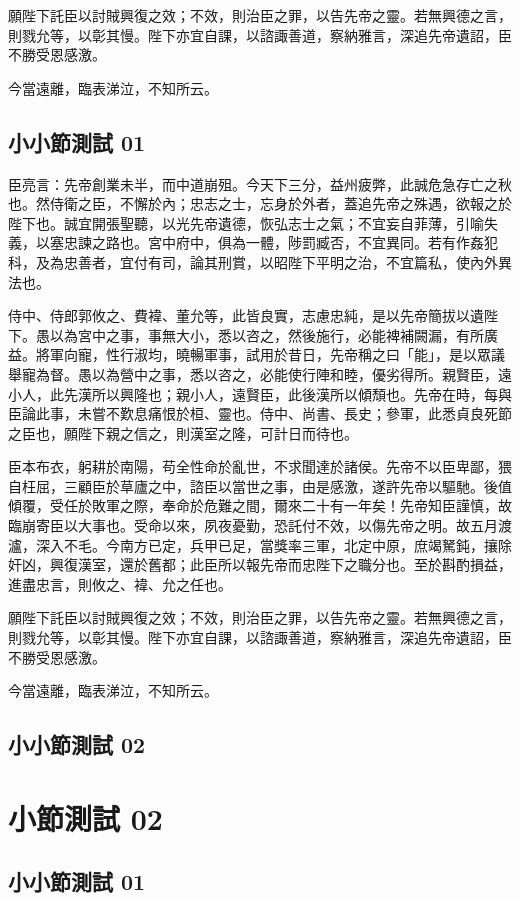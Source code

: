 願陛下託臣以討賊興復之效；不效，則治臣之罪，以告先帝之靈。若無興德之言，則戮允等，以彰其慢。陛下亦宜自課，以諮諏善道，察納雅言，深追先帝遺詔，臣不勝受恩感激。

今當遠離，臨表涕泣，不知所云。
    \subsection{小小節測試 01}
臣亮言：先帝創業未半，而中道崩殂。今天下三分，益州疲弊，此誠危急存亡之秋也。然侍衛之臣，不懈於內；忠志之士，忘身於外者，蓋追先帝之殊遇，欲報之於陛下也。誠宜開張聖聽，以光先帝遺德，恢弘志士之氣；不宜妄自菲薄，引喻失義，以塞忠諫之路也。宮中府中，俱為一體，陟罰臧否，不宜異同。若有作姦犯科，及為忠善者，宜付有司，論其刑賞，以昭陛下平明之治，不宜篇私，使內外異法也。

侍中、侍郎郭攸之、費褘、董允等，此皆良實，志慮忠純，是以先帝簡拔以遺陛下。愚以為宮中之事，事無大小，悉以咨之，然後施行，必能裨補闕漏，有所廣益。將軍向寵，性行淑均，曉暢軍事，試用於昔日，先帝稱之曰「能」，是以眾議舉寵為督。愚以為營中之事，悉以咨之，必能使行陣和睦，優劣得所。親賢臣，遠小人，此先漢所以興隆也；親小人，遠賢臣，此後漢所以傾頹也。先帝在時，每與臣論此事，未嘗不歎息痛恨於桓、靈也。侍中、尚書、長史；參軍，此悉貞良死節之臣也，願陛下親之信之，則漢室之隆，可計日而待也。

臣本布衣，躬耕於南陽，苟全性命於亂世，不求聞達於諸侯。先帝不以臣卑鄙，猥自枉屈，三顧臣於草廬之中，諮臣以當世之事，由是感激，遂許先帝以驅馳。後值傾覆，受任於敗軍之際，奉命於危難之間，爾來二十有一年矣！先帝知臣謹慎，故臨崩寄臣以大事也。受命以來，夙夜憂勤，恐託付不效，以傷先帝之明。故五月渡瀘，深入不毛。今南方已定，兵甲已足，當獎率三軍，北定中原，庶竭駑鈍，攘除奸凶，興復漢室，還於舊都；此臣所以報先帝而忠陛下之職分也。至於斟酌損益，進盡忠言，則攸之、褘、允之任也。

願陛下託臣以討賊興復之效；不效，則治臣之罪，以告先帝之靈。若無興德之言，則戮允等，以彰其慢。陛下亦宜自課，以諮諏善道，察納雅言，深追先帝遺詔，臣不勝受恩感激。

今當遠離，臨表涕泣，不知所云。
    \subsection{小小節測試 02}
    \lipsum[23]
    \section{小節測試 02}
    \lipsum[23]
    \subsection{小小節測試 01}
    \lipsum[23]
